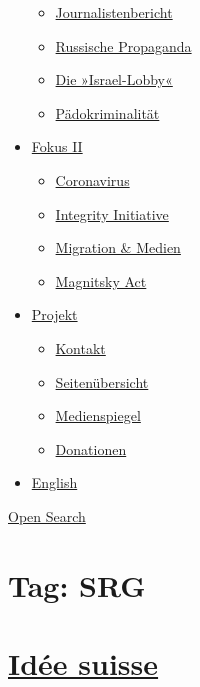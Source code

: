 \begin{itemize}
  \begin{itemize}
  \tightlist
  \item
    \href{https://swprs.org/bericht-eines-journalisten/}{Journalistenbericht}
  \item
    \href{https://swprs.org/russische-propaganda/}{Russische Propaganda}
  \item
    \href{https://swprs.org/die-israel-lobby-fakten-und-mythen/}{Die
    »Israel-Lobby«}
  \item
    \href{https://swprs.org/geopolitik-und-paedokriminalitaet/}{Pädokriminalität}
  \end{itemize}
\item
  \href{https://swprs.org/migration-und-medien/}{Fokus II}

  \begin{itemize}
  \tightlist
  \item
    \href{https://swprs.org/covid-19-hinweis-ii/}{Coronavirus}
  \item
    \href{https://swprs.org/die-integrity-initiative/}{Integrity
    Initiative}
  \item
    \href{https://swprs.org/migration-und-medien/}{Migration \& Medien}
  \item
    \href{https://swprs.org/der-fall-magnitsky/}{Magnitsky Act}
  \end{itemize}
\item
  \href{https://swprs.org/kontakt/}{Projekt}

  \begin{itemize}
  \tightlist
  \item
    \href{https://swprs.org/kontakt/}{Kontakt}
  \item
    \href{https://swprs.org/uebersicht/}{Seitenübersicht}
  \item
    \href{https://swprs.org/medienspiegel/}{Medienspiegel}
  \item
    \href{https://swprs.org/donationen/}{Donationen}
  \end{itemize}
\item
  \href{https://swprs.org/contact/}{English}
\end{itemize}

\protect\hyperlink{}{Open Search}

\hypertarget{tag-srg}{%
\section{Tag: SRG}\label{tag-srg}}

\hypertarget{iduxe9e-suisse}{%
\section{\texorpdfstring{\href{https://swprs.org/2017/03/01/srg-idee-suisse/}{Idée
suisse}}{Idée suisse}}\label{iduxe9e-suisse}}

